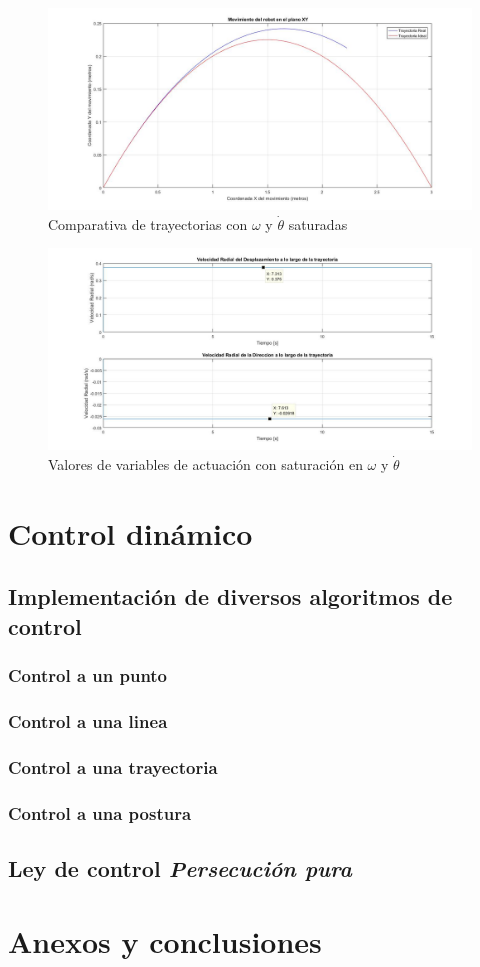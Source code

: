 \documentclass[a4paper,twoside]{article}
\begin{document}
	\begin{figure}[H]
		\centering
		\includegraphics[width=1\textwidth]{parab_8}
		\caption{Comparativa de trayectorias con $\omega$ y $\dot{\theta}$ saturadas}
	\end{figure}
	
	\begin{figure}[H]
		\centering
		\includegraphics[width=1\textwidth]{parab_9}
		\caption{Valores de variables de actuación con saturación en $\omega$ y $\dot{\theta}$}
	\end{figure}

\section{Control dinámico}
	\subsection{Implementación de diversos algoritmos de control}
		\subsubsection{Control a un punto}
		\subsubsection{Control a una linea}
		\subsubsection{Control a una trayectoria}
		\subsubsection{Control a una postura}
	\subsection{Ley de control \textit{Persecución pura}}

\section{Anexos y conclusiones}
\end{document}
